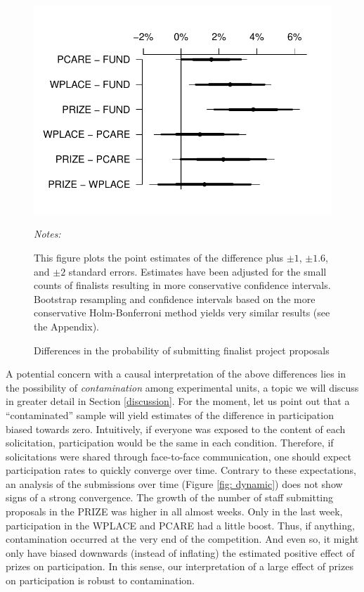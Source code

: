 \documentclass[11pt, titlepage]{article}
\newenvironment{tablenotes}[1][]{
  \begin{minipage}{\textwidth}\emph{Notes:}{\footnotesize #1}
}{\end{minipage}}
\begin{document}
\begin{figure} 
  \centering
  \caption{Differences in the probability of submitting finalist project proposals}
  \label{fig: finalist}
  \includegraphics{Figures/cplot-2.pdf}
  \begin{tablenotes}
  This figure plots the point estimates of the difference plus $\pm 1$, $\pm 1.6$, and $\pm 2$ standard errors. Estimates have been adjusted for the small counts of finalists \citep{agresti2000simple} resulting in more conservative confidence intervals. Bootstrap resampling and confidence intervals based on the more conservative Holm-Bonferroni method yields very similar results (see the Appendix).
  \end{tablenotes}
\end{figure}

A potential concern with a causal interpretation of the above
differences lies in the possibility of \emph{contamination} among
experimental units, a topic we will discuss in greater detail in Section
\ref{discussion}. For the moment, let us point out that a
``contaminated'' sample will yield estimates of the difference in
participation biased towards zero. Intuitively, if everyone was exposed
to the content of each solicitation, participation would be the same in
each condition. Therefore, if solicitations were shared through
face-to-face communication, one should expect participation rates to
quickly converge over time. Contrary to these expectations, an analysis
of the submissions over time (Figure \ref{fig: dynamic}) does not show
signs of a strong convergence. The growth of the number of staff
submitting proposals in the PRIZE was higher in all almost weeks. Only
in the last week, participation in the WPLACE and PCARE had a little
boost. Thus, if anything, contamination occurred at the very end of the
competition. And even so, it might only have biased downwards (instead
of inflating) the estimated positive effect of prizes on participation.
In this sense, our interpretation of a large effect of prizes on
participation is robust to contamination.
\end{document}
